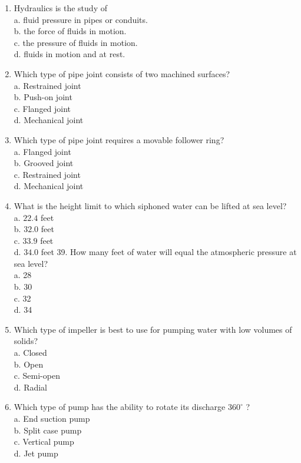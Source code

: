 \documentclass[10pt]{article}
\begin{document}
\begin{enumerate}
  \item Hydraulics is the study of\\
a. fluid pressure in pipes or conduits.\\
b. the force of fluids in motion.\\
c. the pressure of fluids in motion.\\
d. fluids in motion and at rest.

  \item Which type of pipe joint consists of two machined surfaces?\\
a. Restrained joint\\
b. Push-on joint\\
c. Flanged joint\\
d. Mechanical joint

  \item Which type of pipe joint requires a movable follower ring?\\
a. Flanged joint\\
b. Grooved joint\\
c. Restrained joint\\
d. Mechanical joint

  \item What is the height limit to which siphoned water can be lifted at sea level?\\
a. $22.4$ feet\\
b. $32.0$ feet\\
c. $33.9$ feet\\
d. $34.0$ feet 39. How many feet of water will equal the atmospheric pressure at sea level?\\
a. 28\\
b. 30\\
c. 32\\
d. 34

  \item Which type of impeller is best to use for pumping water with low volumes of solids?\\
a. Closed\\
b. Open\\
c. Semi-open\\
d. Radial

  \item Which type of pump has the ability to rotate its discharge $360^{\circ}$ ?\\
a. End suction pump\\
b. Split case pump\\
c. Vertical pump\\
d. Jet pump


\end{enumerate}
\end{document}

